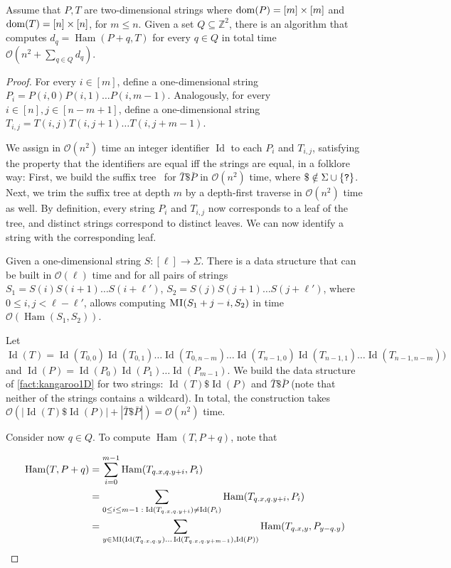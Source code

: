 \documentclass[twoside,leqno]{article}
\newcommand{\Z}{\mathbb{Z}}
\renewcommand{\O}{\mathcal{O}}
\DeclareMathOperator*{\Ham}{Ham}
\DeclareMathOperator*{\ID}{Id}
\newcommand{\absolute}[1]{\left\lvert#1\right\rvert}
\begin{document}
\begin{theorem}\label{kangaroos}
Assume that $P, T$ are two-dimensional strings where $\operatorname*{dom}(P) = [m] \times [m]$ and $\operatorname*{dom}(T) = [n] \times [n]$, for $m \le n$. Given a set $Q \subseteq \Z^2$, there is an algorithm that computes $d_q = \Ham(P + q, T) $ for every $q \in Q$ in total time $\O(n^2 + \sum_{q \in Q} d_q)$.
\end{theorem}
\begin{proof}
For every $i \in [m]$, define a one-dimensional string $P_i = P(i,0) P(i,1) \ldots P(i,m-1)$. Analogously, for every $i \in [n], j \in [n-m+1]$, define a one-dimensional string $T_{i,j} = T(i,j) T(i,j+1) \ldots T(i,j+m-1)$. 

We assign in $\O(n^2)$ time an integer identifier $\ID$ to each $P_i$ and $T_{i,j}$, satisfying the property that the identifiers are equal iff the strings are equal, in a folklore way: First, we build the suffix tree~\cite{DBLP:conf/focs/Weiner73} for $\bar{T} \$ \bar{P}$ in $\O(n^2)$ time, where $\$ \notin \Sigma \cup \{\texttt{?}\}$. Next, we trim the suffix tree at depth $m$ by a depth-first traverse in $\O(n^2)$ time as well. By definition, every string $P_i$ and $T_{i,j}$ now corresponds to a leaf of the tree, and distinct strings correspond to distinct leaves. We can now identify a string with the corresponding leaf. 

\begin{fact}\label{fact:kangaroo1D}
Given a one-dimensional string $S: [\ell] \rightarrow \Sigma$. There is a data structure that can be built in $\O(\ell)$ time and for all pairs of strings $S_1 = S(i) S(i+1) \ldots S(i+\ell')$, $S_2 = S(j) S(j+1) \ldots S(j+\ell')$, where $0 \le i,j < \ell-\ell'$, allows computing $\textnormal{\textsc{MI}}(S_1+j-i, S_2)$ in time $\O(\Ham(S_1,S_2))$. 
\end{fact}

Let $\ID(T) = \ID(T_{0,0}) \ID(T_{0,1}) \ldots \ID(T_{0,n-m}) \ldots \ID(T_{n-1,0}) \ID(T_{n-1,1}) \ldots \ID(T_{n-1,n-m}))$ and $\ID(P) = \ID(P_0)\ID(P_1) \ldots \ID(P_{m-1})$. 
We build the data structure of \cref{fact:kangaroo1D} for two strings: $\ID(T) \$ \ID(P)$ and $\bar{T} \$ \bar{P}$ (note that neither of the strings contains a wildcard). In total, the construction takes $\O(\absolute{\ID(T) \$ \ID(P)} + \absolute{\bar{T} \$ \bar{P}}) = \O(n^2)$ time.

Consider now $q \in Q$. To compute $\Ham(T, P+q)$, note that 

\begin{align*}
\Ham(T, P+q) &= \sum_{i=0}^{m-1} \Ham(T_{\x{q}, \y{q}+i}, P_i)\\
&= \sum_{0 \le i \le m-1 \; : \; \ID(T_{\x{q}, \y{q}+i}) \neq \ID(P_i)} \Ham(T_{\x{q}, \y{q}+i}, P_i) \\
&= \sum_{y \in \MI(\ID(T_{\x{q}, \y{q}}) \ldots \ID(T_{\x{q}, \y{q}+m-1}), \ID(P))} \Ham(T_{\x{q}, y}, P_{y-\y{q}})\\
\end{align*}


\end{proof}
\end{document}
